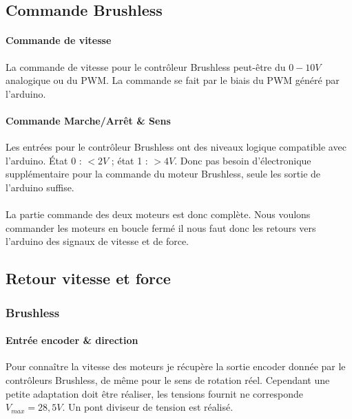 \documentclass[11pt]{article}
\begin{document}
\subsection{Commande Brushless}

\paragraph{Commande de vitesse \\}

La commande de vitesse pour le contrôleur Brushless peut-être du $0-10V$ analogique ou du PWM. La commande se fait par le biais du PWM généré par l'arduino.

\paragraph{Commande Marche/Arrêt \& Sens \\}

Les entrées pour le contrôleur Brushless ont des niveaux logique compatible avec l'arduino. État 0 : $<2V$ ; état 1 : $>4V$. Donc pas besoin d'électronique supplémentaire pour la commande du moteur Brushless, seule les sortie de l'arduino suffise.\\
\\
La partie commande des deux moteurs est donc complète. Nous voulons commander les moteurs en boucle fermé il nous faut donc les retours vers l'arduino des signaux de vitesse et de force.

\subsection{Retour vitesse et force}

\subsubsection{Brushless}

\paragraph{Entrée encoder \& direction \\}

Pour connaître la vitesse des moteurs je récupère la sortie encoder donnée par le contrôleurs Brushless, de même pour le sens de rotation réel. Cependant une petite adaptation doit être réaliser, les tensions fournit ne corresponde $V_{max} = 28,5V$. Un pont diviseur de tension est réalisé.
\end{document}
